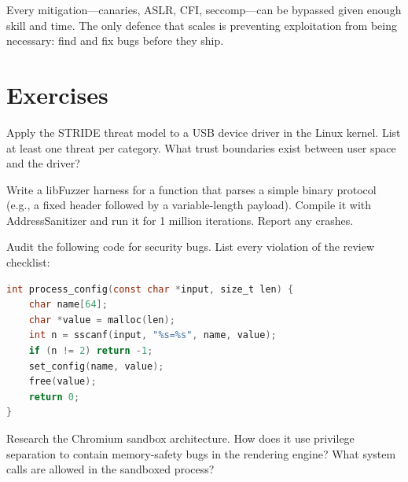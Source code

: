 \begin{principle}
	Every mitigation---canaries, ASLR, CFI, seccomp---can be bypassed given enough skill and time. The only defence that scales is preventing exploitation from being necessary: find and fix bugs before they ship.
\end{principle}

\section{Exercises}

\begin{exercise}
	Apply the STRIDE threat model to a USB device driver in the Linux kernel. List at least one threat per category. What trust boundaries exist between user space and the driver?
\end{exercise}

\begin{exercise}
	Write a libFuzzer harness for a function that parses a simple binary protocol (e.g., a fixed header followed by a variable-length payload). Compile it with AddressSanitizer and run it for 1 million iterations. Report any crashes.
\end{exercise}

\begin{exercise}
	Audit the following code for security bugs. List every violation of the review checklist:
	\begin{lstlisting}[language=C]
int process_config(const char *input, size_t len) {
    char name[64];
    char *value = malloc(len);
    int n = sscanf(input, "%s=%s", name, value);
    if (n != 2) return -1;
    set_config(name, value);
    free(value);
    return 0;
}
	\end{lstlisting}
\end{exercise}

\begin{exercise}
	Research the Chromium sandbox architecture. How does it use privilege separation to contain memory-safety bugs in the rendering engine? What system calls are allowed in the sandboxed process?
\end{exercise}
